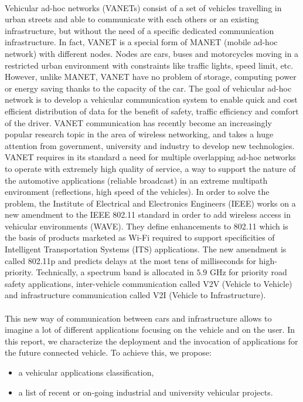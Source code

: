 \documentclass[a4paper]{article}
\begin{document}
\paragraph{}Vehicular ad-hoc networks (VANETs) consist of a set of vehicles travelling in urban streets and able to communicate with each others or an existing infrastructure, but without the need of a specific dedicated communication infrastructure. In fact, VANET is a special form of MANET (mobile ad-hoc network) with different nodes. Nodes are cars, buses and motorcycles moving in a restricted urban environment with constraints like traffic lights, speed limit, etc. However, unlike MANET, VANET have no problem of storage, computing power or energy saving thanks to the capacity of the car. The goal of vehicular ad-hoc network is to develop a vehicular communication system to enable quick and cost efficient distribution of data for the benefit of safety, traffic efficiency and comfort of the driver. VANET communication has recently become an increasingly popular research topic in the area of wireless networking, and takes a huge attention from government, university and industry to develop new technologies. VANET requires in its standard a need for multiple overlapping ad-hoc networks to operate with extremely high quality of service, a way to support the nature of the automotive applications (reliable broadcast) in an extreme multipath environment (reflections, high speed of the vehicles). In order to solve the problem, the Institute of Electrical and Electronics Engineers (IEEE) works on a new amendment to the IEEE 802.11 standard in order to add wireless access in vehicular environments (WAVE). They define enhancements to 802.11 which is the basis of products marketed as Wi-Fi required to support specificities of Intelligent Transportation Systems (ITS) applications. The new amendment is called 802.11p and predicts delays at the most tens of milliseconds for high-priority. Technically, a spectrum band is allocated in $5.9$ GHz for priority road safety applications, inter-vehicle communication called V2V (Vehicle to Vehicle) and infrastructure communication called V2I (Vehicle to Infrastructure). 


\paragraph{}This new way of communication between cars and infrastructure allows to imagine a lot of different applications focusing on the vehicle and on the user. In this report, we characterize the deployment and the invocation of applications for the future connected vehicle. To achieve this, we propose:
\begin{itemize}
\item a vehicular applications classification,
\item a list of recent or on-going industrial and university vehicular projects.
\end{itemize}
\end{document}
